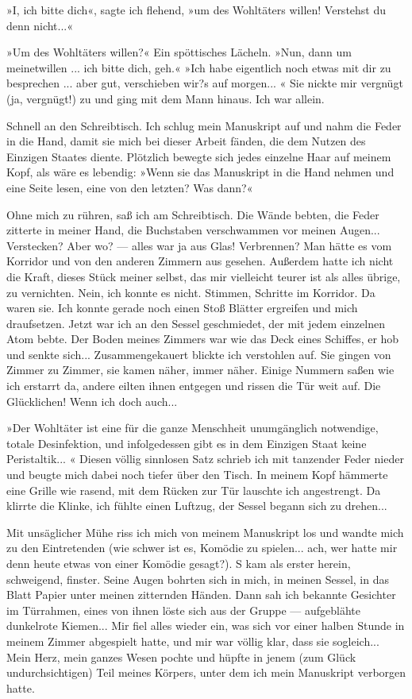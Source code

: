 »I, ich bitte dich«, sagte ich flehend, »um des Wohltäters willen!
Verstehst du denn nicht...«

»Um des Wohltäters willen?« Ein spöttisches Lächeln. »Nun, dann um
meinetwillen ... ich bitte dich, geh.« »Ich habe eigentlich noch
etwas mit dir zu besprechen ... aber gut, verschieben wir?s auf
morgen... « Sie nickte mir vergnügt (ja, vergnügt!) zu und ging mit
dem Mann hinaus. Ich war allein.

Schnell an den Schreibtisch. Ich schlug mein Manuskript auf und
nahm die Feder in die Hand, damit sie mich bei dieser Arbeit
fänden, die dem Nutzen des Einzigen Staates diente. Plötzlich
bewegte sich jedes einzelne Haar auf meinem Kopf, als wäre es
lebendig: »Wenn sie das Manuskript in die Hand nehmen und eine
Seite lesen, eine von den letzten? Was dann?«

Ohne mich zu rühren, saß ich am Schreibtisch. Die Wände bebten, die
Feder zitterte in meiner Hand, die Buchstaben verschwammen vor
meinen Augen... Verstecken? Aber wo? — alles war ja aus Glas!
Verbrennen? Man hätte es vom Korridor und von den anderen Zimmern
aus gesehen. Außerdem hatte ich nicht die Kraft, dieses Stück
meiner selbst, das mir vielleicht teurer ist als alles übrige, zu
vernichten. Nein, ich konnte es nicht. Stimmen, Schritte im
Korridor. Da waren sie. Ich konnte gerade noch einen Stoß Blätter
ergreifen und mich draufsetzen. Jetzt war ich an den Sessel
geschmiedet, der mit jedem einzelnen Atom bebte. Der Boden meines
Zimmers war wie das Deck eines Schiffes, er hob und senkte sich...
Zusammengekauert blickte ich verstohlen auf. Sie gingen von Zimmer
zu Zimmer, sie kamen näher, immer näher. Einige Nummern saßen wie
ich erstarrt da, andere eilten ihnen entgegen und rissen die Tür
weit auf. Die Glücklichen! Wenn ich doch auch...

»Der Wohltäter ist eine für die ganze Menschheit unumgänglich
notwendige, totale Desinfektion, und infolgedessen gibt es in dem
Einzigen Staat keine Peristaltik... « Diesen völlig sinnlosen Satz
schrieb ich mit tanzender Feder nieder und beugte mich dabei noch
tiefer über den Tisch. In meinem Kopf hämmerte eine Grille wie
rasend, mit dem Rücken zur Tür lauschte ich angestrengt. Da klirrte
die Klinke, ich fühlte einen Luftzug, der Sessel begann sich zu
drehen...

Mit unsäglicher Mühe riss ich mich von meinem Manuskript los und
wandte mich zu den Eintretenden (wie schwer ist es, Komödie zu
spielen... ach, wer hatte mir denn heute etwas von einer Komödie
gesagt?). S kam als erster herein, schweigend, finster. Seine Augen
bohrten sich in mich, in meinen Sessel, in das Blatt Papier unter
meinen zitternden Händen. Dann sah ich bekannte Gesichter im
Türrahmen, eines von ihnen löste sich aus der Gruppe — aufgeblähte
dunkelrote Kiemen... Mir fiel alles wieder ein, was sich vor einer
halben Stunde in meinem Zimmer abgespielt hatte, und mir war völlig
klar, dass sie sogleich... Mein Herz, mein ganzes Wesen pochte und
hüpfte in jenem (zum Glück undurchsichtigen) Teil meines Körpers,
unter dem ich mein Manuskript verborgen hatte.

